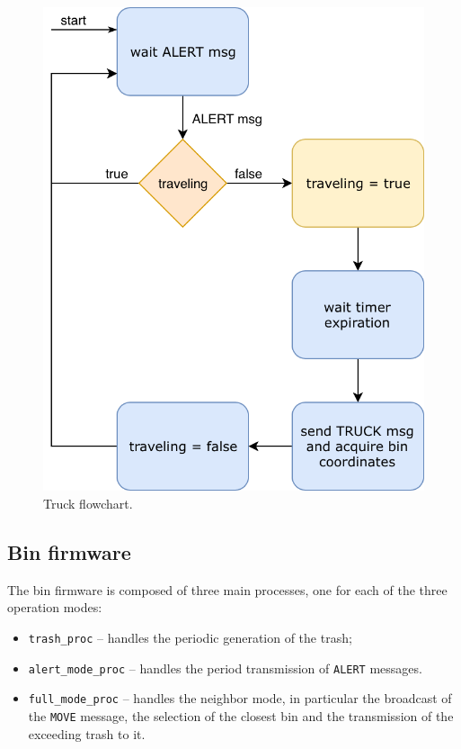 \documentclass[a4paper, 11pt, parskip=half]{scrartcl}
\begin{document}
\begin{figure}[H]
\begin{minipage}[t]{0.37\textwidth}
        \includegraphics[width=1\textwidth]{resources/truck_flow_chart}
        \caption{Truck flowchart.}
        \label{fig:bin-flow}
    \end{minipage}
\end{figure}

\subsection{Bin firmware}

The bin firmware is composed of three main processes, one for each of the three operation modes:

\begin{itemize}
    \item \texttt{trash\_proc} -- handles the periodic generation of the trash;
    \item \texttt{alert\_mode\_proc} -- handles the period transmission of \texttt{ALERT} messages.
    \item \texttt{full\_mode\_proc} -- handles the neighbor mode, in particular the broadcast of the \texttt{MOVE} message, the selection of the closest bin and the transmission of the exceeding trash to it.
\end{itemize}
\end{document}
